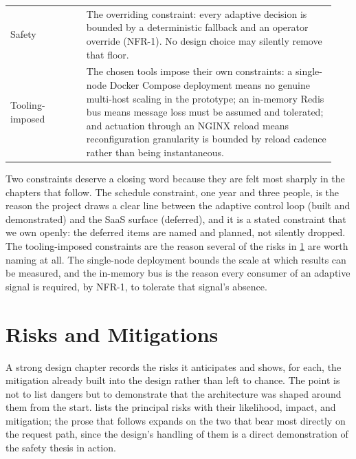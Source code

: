 \begin{table}[H]
\begin{tabular}{@{}p{0.22\linewidth}p{0.72\linewidth}@{}}
Safety & The overriding constraint: every adaptive decision is bounded by a
deterministic fallback and an operator override (NFR-1). No design choice may silently
remove that floor. \\
Tooling-imposed & The chosen tools impose their own constraints: a single-node Docker
Compose deployment means no genuine multi-host scaling in the prototype; an in-memory
Redis bus means message loss must be assumed and tolerated; and actuation through an
NGINX reload means reconfiguration granularity is bounded by reload cadence rather than
being instantaneous. \\
\bottomrule
\end{tabular}
\end{table}

Two constraints deserve a closing word because they are felt most sharply in the
chapters that follow. The schedule constraint, one year and three people, is the
reason the project draws a clear line between the adaptive control loop (built and
demonstrated) and the SaaS surface (deferred), and it is a stated constraint that we
own openly: the deferred items are named and planned, not silently dropped. The
tooling-imposed constraints are the reason several of the risks in
\cref{dsa:sec:risks} are worth naming at all. The single-node deployment bounds the
scale at which results can be measured, and the in-memory bus is the reason every
consumer of an adaptive signal is required, by NFR-1, to tolerate that signal's
absence.

\section{Risks and Mitigations}
\label{dsa:sec:risks}

A strong design chapter records the risks it anticipates and shows, for each, the
mitigation already built into the design rather than left to chance. The point is not
to list dangers but to demonstrate that the architecture was shaped around them from
the start.  lists the principal risks with their likelihood,
impact, and mitigation; the prose that follows expands on the two that bear most
directly on the request path, since the design's handling of them is a direct
demonstration of the safety thesis in action.

